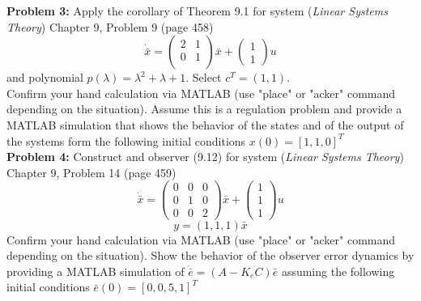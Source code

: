 \documentclass[12pt]{article}
\begin{document}
\noindent
\textbf{Problem 3:} Apply the corollary of Theorem 9.1 for system ({\em Linear Systems Theory}) Chapter 9, Problem 9 (page 458)
$$
\dot{\bar{x}}=
\begin{pmatrix}
	2 & 1 \\
	0 & 1 \\
\end{pmatrix}
\bar{x}+
\begin{pmatrix}
	1 \\
	1
\end{pmatrix} u
$$
and polynomial $p(\lambda)=\lambda^2+\lambda+1$. Select $c^T=(1, 1)$.\\
Confirm your hand calculation via MATLAB (use "place" or "acker" command depending on the situation). Assume this is a regulation problem and provide a MATLAB simulation that shows the behavior of the states and of the output of the systems form the following initial conditions $x(0)=[1,1,0]^T$\\

\noindent
\textbf{Problem 4:} Construct and observer (9.12) for system ({\em Linear Systems Theory}) Chapter 9, Problem 14 (page 459)
$$
\dot{\bar{x}}=
\begin{pmatrix}
	0 & 0 & 0 \\
	0 & 1 & 0 \\
	0 & 0 & 2
\end{pmatrix}
\bar{x}+
\begin{pmatrix}
	1 \\
	1 \\
	1
\end{pmatrix} u
$$
$$y=(1,1,1)\bar{x}$$
Confirm your hand calculation via MATLAB (use "place" or "acker" command depending on the situation). Show the behavior of the observer error dynamics by providing a MATLAB simulation of $\dot{\bar{e}}=(A-K_eC)\bar{e}$ assuming the following initial conditions $\bar{e}(0)=[0,0,5,1]^T$
\end{document}
